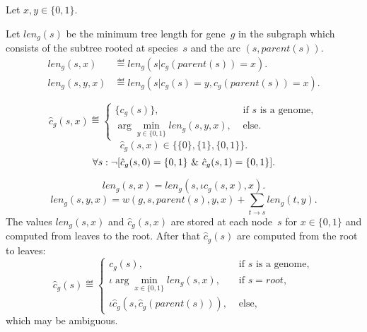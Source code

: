 \documentclass[10pt,a4paper]{article}
\theoremstyle{plain} \newtheorem{Lem}{Lemma}
\begin{document}
Let $x, y \in \{0,1\}$.

Let $len_g(s)$ be the minimum tree length for gene~$g$ in the subgraph which consists of the subtree rooted at species~$s$ and the arc $(s,parent(s))$.
\begin{equation*}
  \begin{split}
    len_g(s,x)   &\eqdef len_g(s|c_g(parent(s)) = x). \\
    len_g(s,y,x) &\eqdef len_g(s|c_g(s) = y, c_g(parent(s)) = x).
  \end{split}
\end{equation*}

\begin{equation*}
\hat c_g(s,x) \eqdef
  \begin{cases}
    \{c_g(s)\}, &\text{ if $s$ is a genome},\\
    \arg \min_{y \in \{0,1\}} len_g(s,y,x), &\text{ else}.
  \end{cases}
\end{equation*}
$$ \hat c_g(s,x) \in \{\{0\}, \{1\}, \{0,1\} \}. $$
$$ \forall s: \neg [\hat c_g(s,0) = \{0,1\} \ \& \  \hat c_g(s,1) = \{0,1\}]. $$


$$ len_g(s,x) = len_g(s, \iota \hat c_g(s,x), x). $$
$$ len_g(s,y,x) = w(g,s,parent(s),y,x) + \sum_{t \to s} len_g(t,y). $$
The values $len_g(s,x)$ and $\hat c_g(s,x)$ are stored at each node~$s$ for $x \in \{0,1\}$ and computed from leaves to the root.
After that $\hat c_g(s)$ are computed from the root to leaves:
\begin{equation*}
 \hat c_g(s) \eqdef
  \begin{cases}
    c_g(s), &\text{ if $s$ is a genome},\\
    \iota \arg \min_{x \in \{0,1\}} len_g(s,x), &\text{ if } s = root,\\
    \iota \hat c_g(s, \hat c_g(parent(s))), &\text{ else},
  \end{cases}
\end{equation*}
which may be ambiguous.
\end{document}
